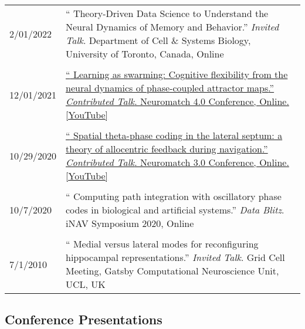 \documentclass[10pt]{article}
\newcommand{\itemtitle}[1]{{\color{hopkinsblue}\ul{#1}}}
\newcommand{\unpubtitle}[1]{{\color{hopkinsblue} #1}}
\begin{document}
\begin{tabular}{@{\hspace{0.2in}}l>{\raggedright\arraybackslash}p{}}
  2/01/2022 \hspace{0.2in} & ``\unpubtitle{Theory-Driven Data Science to
  Understand the Neural Dynamics of Memory and Behavior}.'' \emph{Invited Talk}.
  Department of Cell \& Systems Biology, University of Toronto, Canada, Online \\
  \tabularnewline
  12/01/2021 \hspace{0.2in} &
  \href{https://youtu.be/3mKkLksOyfk}{``\unpubtitle{Learning as swarming:
      Cognitive flexibility from the neural dynamics of phase-coupled attractor
    maps}.'' \emph{Contributed Talk}. Neuromatch 4.0 Conference, Online.
  \itemtitle{[YouTube]}}\\
  \tabularnewline
  10/29/2020 \hspace{0.2in} &
  \href{https://www.youtube.com/watch?v=WwYDMpD7j4Q}{``\unpubtitle{Spatial
      theta-phase coding in the lateral septum: a theory of allocentric feedback
    during navigation}.'' \emph{Contributed Talk}. Neuromatch 3.0 Conference,
  Online. \itemtitle{[YouTube]}}\\
  \tabularnewline
  10/7/2020 \hspace{0.2in} & ``\unpubtitle{Computing path integration with
  oscillatory phase codes in biological and artificial systems}.'' \emph{Data
  Blitz}. iNAV Symposium 2020, Online\\
  \tabularnewline
  7/1/2010 \hspace{0.2in} & ``\unpubtitle{Medial versus lateral modes for
  reconfiguring hippocampal representations}.'' \emph{Invited Talk}. Grid
  Cell Meeting, Gatsby Computational Neuroscience Unit, UCL, UK\\
\end{tabular}


\subsection*{Conference Presentations}
\label{sec:posters}
\end{document}
